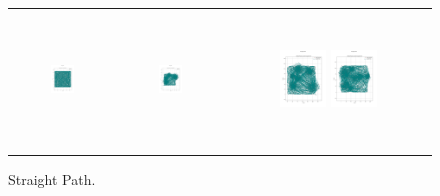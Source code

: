 \begin{figure}[p]
\begin{tabular}{ccc}
        \includegraphics[height=36mm,width=0.24\textwidth]{Images/simulation_no_obs/straight_paths/51.png}
        & \includegraphics[height=36mm,width=0.24\textwidth]{Images/simulation_no_obs/straight_paths/52.png}
        & \includegraphics[height=36mm,width=0.24\textwidth]{Images/simulation_no_obs/straight_paths/53.png}
        \includegraphics[height=36mm,width=0.24\textwidth]{Images/simulation_no_obs/straight_paths/54.png}\\[-4pt]

    \end{tabular}
    \caption{Straight Path.\label{fig:straight_path}}
\end{figure}


\vspace*{6mm}


